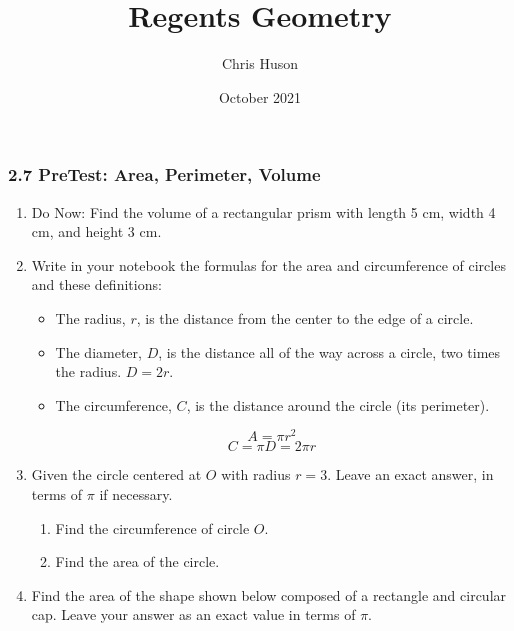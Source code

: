 \documentclass[12pt, twoside]{article}
\title{Regents Geometry}
\author{Chris Huson}
\date{October 2021}
\begin{document}
\subsubsection*{2.7 PreTest: Area, Perimeter, Volume}
\begin{enumerate}
\item Do Now: Find the volume of a rectangular prism with length 5 cm, width 4 cm, and height 3 cm. \vspace{1cm}

\item Write in your notebook the formulas for the area and circumference of circles and these definitions:
\begin{itemize}
  \item The radius, $r$, is the distance from the center to the edge of a circle. 
  \item The diameter, $D$, is the distance all of the way across a circle, two times the radius. $D=2r$. 
  \item The circumference, $C$, is the distance around the circle (its perimeter).
  
\end{itemize}
  \[A=\pi r^2\]
  \[C=\pi D = 2\pi r\]
  
\item Given the circle centered at $O$ with radius $r=3$. Leave an exact answer, in terms of $\pi$ if necessary.
  \begin{multicols}{2}
    \begin{enumerate}
      \item Find the circumference of circle $O$. %
      \item Find the area of the circle.\vspace{2cm}
    \end{enumerate}
  \end{multicols}

    
\item Find the area of the shape shown below composed of a rectangle and circular cap. Leave your answer as an exact value in terms of $\pi$.
\begin{flushright}
\end{flushright}


\end{enumerate}
\end{document}
